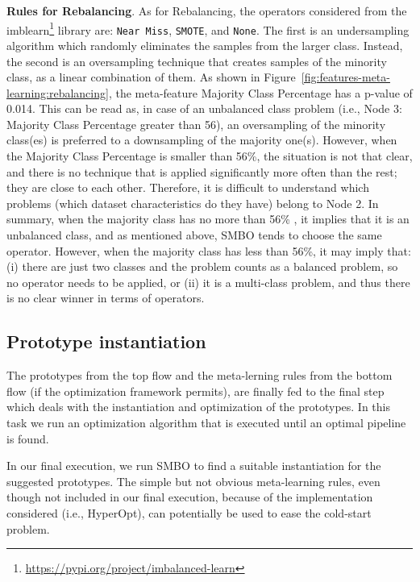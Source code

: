 \begin{example}
\textbf{Rules for Rebalancing}. As for Rebalancing, the operators considered from the imblearn\footnote{\url{https://pypi.org/project/imbalanced-learn}} library are: \texttt{Near Miss}, \texttt{SMOTE}, and \texttt{None}. %
The first is an undersampling algorithm which randomly eliminates the samples from the larger class.
Instead, the second is an oversampling technique that creates samples of the minority class, as a linear combination of them.
As shown in Figure~\ref{fig:features-meta-learning:rebalancing}, the meta-feature Majority Class Percentage has a p-value of 0.014.
This can be read as, in case of an unbalanced class problem (i.e., Node 3: Majority Class Percentage greater than 56), an oversampling of the minority class(es) is preferred to a downsampling of the majority one(s).
However, when the Majority Class Percentage is smaller than 56\%, the situation is not that clear, and there is no technique that is applied significantly more often than the rest; they are close to each other.
Therefore, it is difficult to understand which problems (which dataset characteristics do they have) belong to Node 2.
In summary, when the majority class has no more than 56\% , it implies that it is an unbalanced class, and as mentioned above, SMBO tends to choose the same operator. However, when the majority class has less than 56\%, it may imply that: (i) there are just two classes and the problem counts as a balanced problem, so no operator needs to be applied, or (ii) it is a multi-class problem, and thus there is no clear winner in terms of operators. 
\end{example}

\subsection{Prototype instantiation}
\label{effective-ssec:protoype-insta}

The prototypes from the top flow and the meta-lerning rules from the bottom flow (if the optimization framework permits), are finally fed to the final step which deals with the instantiation and optimization of the prototypes. In this task we run an optimization algorithm that is executed until an optimal pipeline is found.

\begin{example}
 In our final execution, we run SMBO to find a suitable instantiation for the suggested prototypes. The simple but not obvious meta-learning rules, even though not included in our final execution, because of the implementation considered (i.e., HyperOpt), can potentially be used to ease the cold-start problem. 
\end{example}

